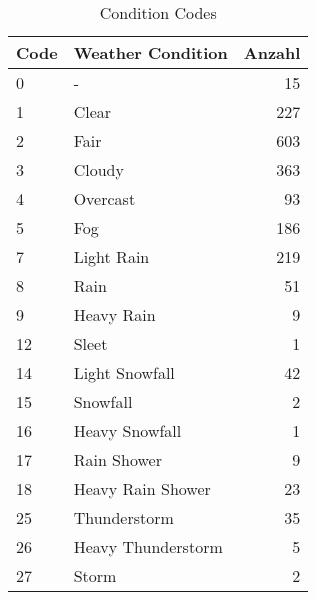 \begin{table}[t]
    \caption{Condition Codes}
    \label{Condition Codes}
    \centering
    \small
    \begin{tabular}{l l r}
        \toprule
        Code & Weather Condition\cite{coco:2021} & Anzahl\\
        \midrule
        0 & - & 15\\
        1 & Clear & 227\\
        2 & Fair & 603\\
        3 & Cloudy & 363\\
        4 & Overcast & 93\\
        5 & Fog & 186\\
        7 & Light Rain & 219\\
        8 & Rain & 51\\
        9 & Heavy Rain & 9\\
        12 & Sleet & 1\\
        14 & Light Snowfall & 42\\
        15 & Snowfall & 2\\
        16 & Heavy Snowfall & 1\\
        17 & Rain Shower & 9\\
        18 & Heavy Rain Shower & 23\\
        25 & Thunderstorm & 35\\
        26 & Heavy Thunderstorm & 5\\
        27 & Storm & 2\\
        \bottomrule
    \end{tabular}
\end{table}